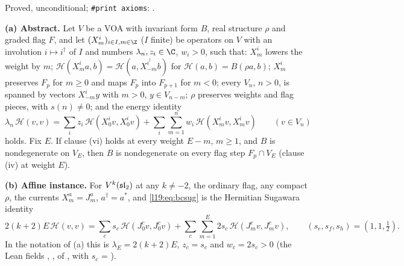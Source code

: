 \begin{status}
Proved, unconditional; \texttt{\#print axioms}: .
\end{status}

\begin{theorem}\label{l19:thm:bcnowall}
\textbf{(a) Abstract.} Let $V$ be a VOA with invariant form $B$, real structure $\rho$ and graded flag $F$, and let
$(X^i_m)_{i\in I,m\in\Z}$ ($I$ finite) be operators on $V$ with an involution $i\mapsto i^\dagger$ of $I$ and numbers
$\lambda_n,z_i\in\C$, $w_i>0$, such that: $X^i_m$ lowers the weight by $m$; $\mathcal H(X^i_ma,b) = \mathcal H(a,X^{i^\dagger}_{-m}b)$
for $\mathcal H(a,b) = B(\rho a,b)$; $X^i_m$ preserves $F_p$ for $m\ge0$ and maps $F_p$ into $F_{p+1}$ for $m<0$; every
$V_n$, $n>0$, is spanned by vectors $X^i_{-m}y$ with $m>0$, $y\in V_{n-m}$; $\rho$ preserves weights and flag pieces,
with $s(n)\ne0$; and the energy identity
\begin{equation}\label{l19:eq:bcsug}
  \lambda_n\,\mathcal H(v,v) = \sum_iz_i\,\mathcal H(X^i_0v,X^i_0v) + \sum_i\sum_{m=1}^{n}w_i\,\mathcal H(X^i_mv,X^i_mv)\qquad(v\in V_n)
\end{equation}
holds. Fix $E$. If clause (vi) holds at every weight $E-m$, $m\ge1$, and $B$ is nondegenerate on $V_E$, then $B$ is
nondegenerate on every flag step $F_p\cap V_E$ (clause (iv) at weight $E$).

\textbf{(b) Affine instance.} For $V^k(\mathfrak{sl}_2)$ at any $k\ne-2$, the ordinary flag, any compact $\rho$, the
currents $X^a_m = J^a_m$, $a^\dagger = a^*$, and \eqref{l19:eq:bcsug} is the Hermitian Sugawara identity
\begin{equation*}
  2(k+2)E\,\mathcal H(v,v) = \sum_cs_c\,\mathcal H(J^c_0v,J^c_0v) + \sum_c\sum_{m=1}^{E}2s_c\,\mathcal H(J^c_mv,J^c_mv),\qquad
  (s_e,s_f,s_h) = (1,1,\tfrac12).
\end{equation*}
In the notation of (a) this is $\lambda_E = 2(k+2)E$, $z_c = s_c$ and $w_c = 2s_c>0$ (the Lean fields
, ,  of , with $s_c$ = ).
\end{theorem}

